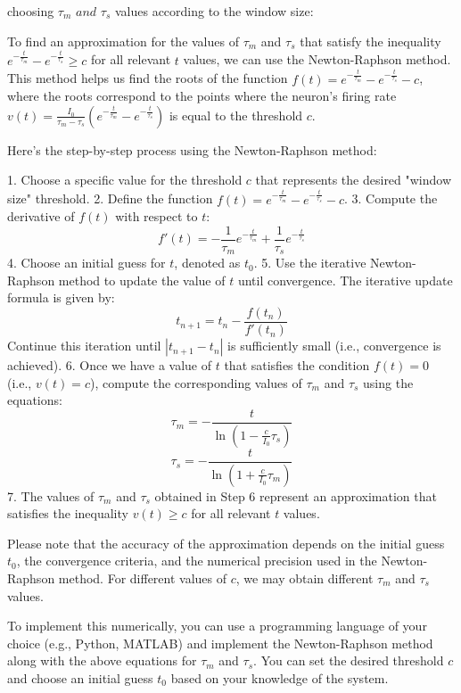 choosing \( \tau_m \textit{ and } \tau_s\) values according to the window size:

To find an approximation for the values of \(\tau_m\) and \(\tau_s\) that satisfy the inequality \(e^{-\frac{t}{\tau_m}} - e^{-\frac{t}{\tau_s}} \geq c\) for all relevant \(t\) values, we can use the Newton-Raphson method. This method helps us find the roots of the function \(f(t) = e^{-\frac{t}{\tau_m}} - e^{-\frac{t}{\tau_s}} - c\), where the roots correspond to the points where the neuron's firing rate \(v(t) = \frac{I_0}{\tau_m - \tau_s} \left(e^{-\frac{t}{\tau_m}} - e^{-\frac{t}{\tau_s}}\right)\) is equal to the threshold \(c\).

Here's the step-by-step process using the Newton-Raphson method:

1. Choose a specific value for the threshold \(c\) that represents the desired "window size" threshold.
2. Define the function \(f(t) = e^{-\frac{t}{\tau_m}} - e^{-\frac{t}{\tau_s}} - c\).
3. Compute the derivative of \(f(t)\) with respect to \(t\):
\[
f'(t) = -\frac{1}{\tau_m}e^{-\frac{t}{\tau_m}} + \frac{1}{\tau_s}e^{-\frac{t}{\tau_s}}
\]
4. Choose an initial guess for \(t\), denoted as \(t_0\).
5. Use the iterative Newton-Raphson method to update the value of \(t\) until convergence. The iterative update formula is given by:
\[
t_{n+1} = t_n - \frac{f(t_n)}{f'(t_n)}
\]
Continue this iteration until \(|t_{n+1} - t_n|\) is sufficiently small (i.e., convergence is achieved).
6. Once we have a value of \(t\) that satisfies the condition \(f(t) = 0\) (i.e., \(v(t) = c\)), compute the corresponding values of \(\tau_m\) and \(\tau_s\) using the equations:
\[
\tau_m = -\frac{t}{\ln(1 - \frac{c}{I_0} \tau_s)}
\]
\[
\tau_s = -\frac{t}{\ln(1 + \frac{c}{I_0} \tau_m)}
\]
7. The values of \(\tau_m\) and \(\tau_s\) obtained in Step 6 represent an approximation that satisfies the inequality \(v(t) \geq c\) for all relevant \(t\) values.

Please note that the accuracy of the approximation depends on the initial guess \(t_0\), the convergence criteria, and the numerical precision used in the Newton-Raphson method. For different values of \(c\), we may obtain different \(\tau_m\) and \(\tau_s\) values.

To implement this numerically, you can use a programming language of your choice (e.g., Python, MATLAB) and implement the Newton-Raphson method along with the above equations for \(\tau_m\) and \(\tau_s\). You can set the desired threshold \(c\) and choose an initial guess \(t_0\) based on your knowledge of the system.

